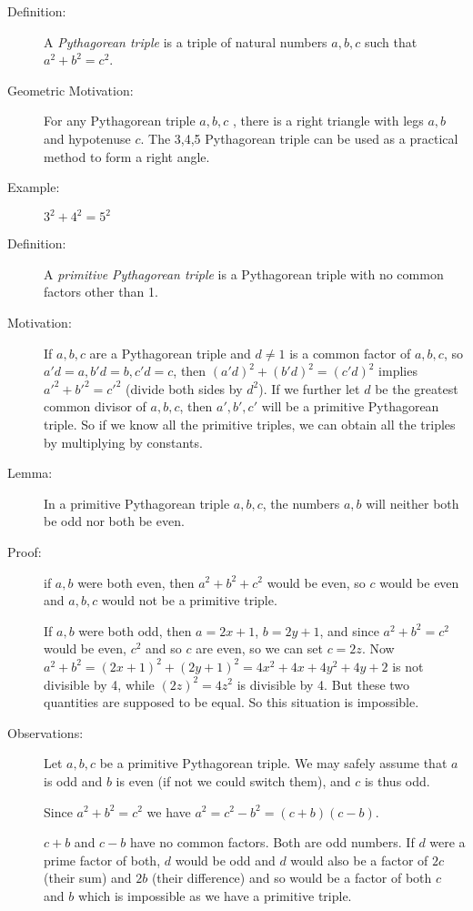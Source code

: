 \documentclass[12pt]{article}
\begin{document}
\begin{description}

\item[Definition:]   A {\em Pythagorean triple\/} is a triple of natural numbers $a,b,c$ such that $a^2+b^2=c^2$.

\item[Geometric Motivation:]   For any Pythagorean triple $a,b,c$ , there is a right triangle with legs $a,b$  and hypotenuse $c$.  The 3,4,5 Pythagorean triple can be used as a practical method to form a right angle.

\item[Example:]  $3^2+4^2=5^2$

\item[Definition:]  A {\em primitive Pythagorean triple\/} is a Pythagorean triple with no common factors other than 1.

\item[Motivation:]  If $a,b,c$ are a Pythagorean triple and $d \neq 1$ is a common factor of $a,b,c$,
so $a'd=a, b'd=b, c'd=c$, then $(a'd)^2 + (b'd)^2 = (c'd)^2$ implies $a'^2+b'^2=c'^2$ (divide both sides by
$d^2$).   If we further let $d$ be the greatest common divisor of $a,b,c$, then $a',b',c'$ will be a primitive Pythagorean triple.   So if we know all the primitive triples, we can obtain all the triples by multiplying by constants.

\item[Lemma:]  In a primitive Pythagorean triple $a,b,c$, the numbers $a,b$ will neither both be odd nor both be even.

\item[Proof:]  if $a,b$ were both even, then $a^2+b^2+c^2$ would be even, so $c$ would be even and
$a,b,c$ would not be a primitive triple.

If $a,b$ were both odd, then $a=2x+1$, $b=2y+1$, and since $a^2+b^2=c^2$ would be even, $c^2$ and so $c$
are even, so we can set $c=2z$.   Now $a^2+b^2=(2x+1)^2+(2y+1)^2 = 4x^2+4x+4y^2+4y+2$ is not divisible by 4, while $(2z)^2= 4z^2$ is divisible by 4.  But these two quantities are supposed to be equal.  So this situation is impossible.

\item[Observations:]  Let $a,b,c$ be a primitive Pythagorean triple.   We may safely assume that $a$ is odd and $b$ is even (if not we could switch them), and $c$ is thus odd.

Since $a^2+b^2=c^2$ we have $a^2=c^2-b^2=(c+b)(c-b)$.

$c+b$ and $c-b$ have no common factors.  Both are odd numbers.   If $d$ were a prime factor of both,
$d$ would be odd and $d$ would also be a factor of $2c$ (their sum) and $2b$ (their difference) and so would be
a factor of both $c$ and $b$ which is impossible as we have a primitive triple.


\end{description}
\end{document}
